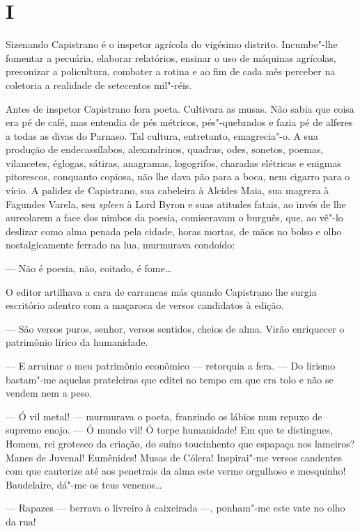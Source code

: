 \section*{I}

\noindent{}Sizenando Capistrano é o inspetor agrícola do vigésimo distrito.
Incumbe"-lhe fomentar a pecuária, elaborar relatórios, ensinar o uso de
máquinas agrícolas, preconizar a policultura, combater a rotina e ao fim
de cada mês perceber na coletoria a realidade de setecentos mil"-réis.

Antes de inspetor Capistrano fora poeta. Cultivara as musas. Não sabia
que coisa era pé de café, mas entendia de pés métricos, pés"-quebrados e
fazia pé de alferes a todas as divas do Parnaso. Tal cultura,
entretanto, emagrecia"-o. A sua produção de endecassílabos, alexandrinos,
quadras, odes, sonetos, poemas, vilancetes, églogas, sátiras, anagramas,
logogrifos, charadas elétricas e enigmas pitorescos, conquanto copiosa,
não lhe dava pão para a boca, nem cigarro para o vício. A palidez de
Capistrano, sua cabeleira à Alcides Maia, sua magreza à Fagundes Varela,
seu \emph{spleen} à Lord Byron e suas atitudes fatais, ao invés de lhe
aureolarem a face dos nimbos da poesia, comiseravam o burguês, que, ao
vê"-lo deslizar como alma penada pela cidade, horas mortas, de mãos no
bolso e olho nostalgicamente ferrado na lua, murmurava condoído:

--- Não é poesia, não, coitado, é fome\ldots{}

O editor artilhava a cara de carrancas más quando Capistrano lhe surgia
escritório adentro com a maçaroca de versos candidatos à edição.

--- São versos puros, senhor, versos sentidos, cheios de alma. Virão
enriquecer o patrimônio lírico da humanidade.

--- E arruinar o meu patrimônio econômico --- retorquia a fera. --- Do
lirismo bastam"-me aquelas prateleiras que editei no tempo em que era
tolo e não se vendem nem a peso.

--- Ó vil metal! --- murmurava o poeta, franzindo os lábios num repuxo
de supremo enojo. --- Ó mundo vil! Ó torpe humanidade! Em que te
distingues, Homem, rei grotesco da criação, do suíno toucinhento que
espapaça nos lameiros? Manes de Juvenal! Eumênides! Musas de Cólera!
Inspirai"-me versos candentes com que cauterize até aos penetrais da alma
este verme orgulhoso e mesquinho! Baudelaire, dá"-me os teus venenos\ldots{}

--- Rapazes --- berrava o livreiro à caixeirada ---, ponham"-me este vate
no olho da rua!

